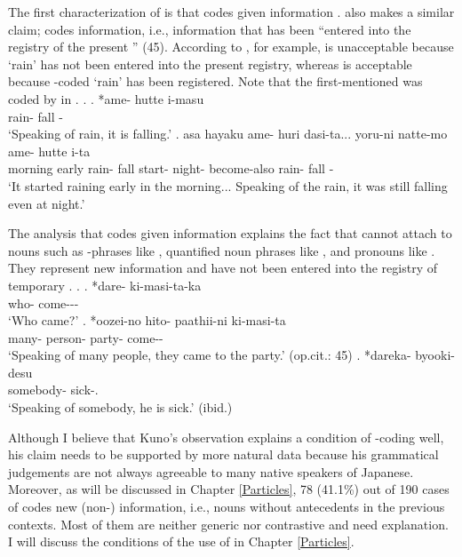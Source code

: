 The first characterization of  is that
 codes given information
\cite[233]{chafe70}.
 also makes a similar claim;
 codes  information,
i.e.,
information that has been ``entered into the registry of the
present '' (45).
According to , for example,
\Next[a] is unacceptable because
 `rain' has not been entered into the present registry,
whereas \Next[b] is acceptable because
-coded  `rain' has been registered.
Note that the first-mentioned  was coded by  in \Next[b].
%
\ex.
 \ag. *ame- hutte i-masu \\
       rain- fall - \\
       `Speaking of rain, it is falling.'
 \bg. asa hayaku ame- huri dasi-ta... yoru-ni natte-mo ame- hutte i-ta \\
       morning early rain- fall start- night- become-also rain- fall -\\
       `It started raining early in the morning...
       Speaking of the rain, it was still falling even at night.'
       \hfill{\cite[45]{kuno73}}


The analysis that  codes given information
explains the fact that
 cannot attach to nouns such as -phrases like \Next[a],
quantified noun phrases like \Next[b],
and  pronouns like \Next[c].
They represent new information and have not been entered into the registry of temporary .
%
\ex.
 \ag. *dare- ki-masi-ta-ka \\
       who- come--- \\
       `Who came?'
       \hfill{\cite[37]{kuno73}}
 \bg. *oozei-no hito- paathii-ni ki-masi-ta \\
       many- person- party- come-- \\
       `Speaking of many people, they came to the party.'
       \hfill{(op.cit.: 45)}
 \bg. *dareka- byooki-desu \\
       somebody- sick-.\\
       `Speaking of somebody, he is sick.'
       \hfill{(ibid.)}


Although I believe that Kuno's observation explains
a condition of -coding well,
his claim needs to be supported by more natural data
because his grammatical judgements are not always agreeable to many native speakers of Japanese.
Moreover,
as will be discussed in Chapter \ref{Particles},
78 (41.1\%) out of 190 cases of  codes new (non-) information, i.e., nouns without antecedents in the previous contexts. 
Most of them are neither generic nor contrastive and need explanation.
I will discuss the conditions of the use of 
in Chapter \ref{Particles}.


